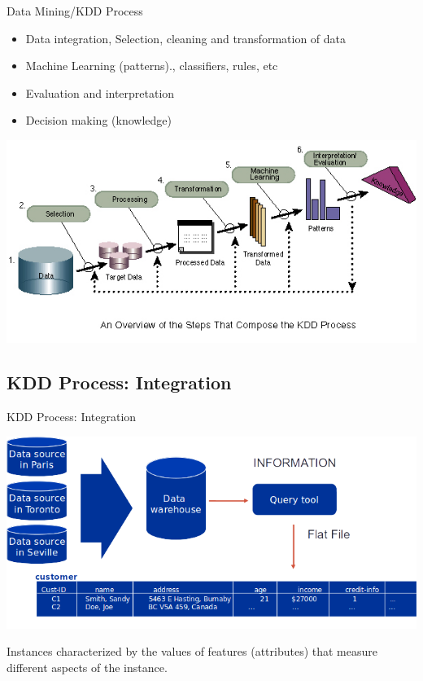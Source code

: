 \documentclass{beamer}
\begin{document}
\begin{frame}{Data Mining/KDD Process}

\begin{itemize}
 \item Data integration, Selection, cleaning and transformation of data
 \item Machine Learning (patterns)., classifiers, rules, etc
 \item Evaluation and interpretation
 \item Decision making (knowledge)
\end{itemize}

\begin{center}
\includegraphics[width=.8\textwidth]{figs/DMProcess}
\end{center}

\end{frame}

\subsection{KDD Process: Integration}

\begin{frame}{KDD Process: Integration}

\begin{center}
\includegraphics[width=.8\textwidth]{figs/DataIntegration}
\end{center}

Instances characterized by the values of features (attributes) that measure
different aspects of the instance.

\end{frame}
\end{document}
